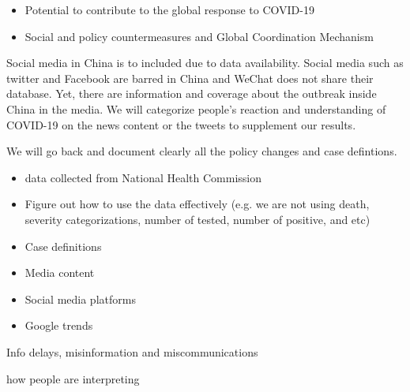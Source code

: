 \begin{itemize}
\item{Potential to contribute to the global response to COVID-19}
\item{Social and policy countermeasures and Global Coordination Mechanism}
\end{itemize}


Social media in China is to included due to data availability.   Social media such as twitter and Facebook are barred in China and WeChat does not share their database. Yet, there are information and coverage about the outbreak inside China in the media.  We will categorize people’s reaction and understanding of COVID-19  on the news content or the tweets to supplement our results.



We will go back and document clearly all the policy changes and case defintions. 

\begin{itemize}
\item{data collected from National Health Commission}
\item{Figure out how to use the data effectively (e.g. we are not using death, severity categorizations, number of tested, number of positive, and etc)}
\item{Case definitions}
\item{Media content}
\item{Social media platforms}
\item{Google trends}
\end{itemize}


Info delays, misinformation and miscommunications


how people are interpreting 

